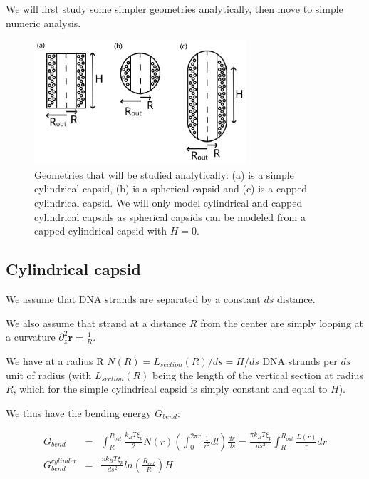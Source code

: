 \documentclass{article}
\begin{document}
We will first study some simpler geometries analytically, then move to simple numeric analysis.

\begin{figure}[H]
    \centering
    \includegraphics[width=0.7\textwidth]{analitical_geometries.png}
    \caption{Geometries that will be studied analytically: (a) is a simple cylindrical capsid, (b) is a spherical capsid and (c) is a capped cylindrical capsid. We will only model cylindrical and capped cylindrical capsids as spherical capsids can be modeled from a capped-cylindrical capsid with $H=0$.}
    \label{fig:enter-label}
\end{figure}

\subsection{Cylindrical capsid}

We assume that DNA strands are separated by a constant $ds$ distance.

We also assume that strand at a distance $R$ from the center are simply looping at a curvature $\partial_z^2 \mathbf{r} = \frac{1}{R}$.

We have at a radius R $N(R) = L_{section}(R)/ds = H/ds$ DNA strands per $ds$ unit of radius (with $L_{section}(R)$ being the length of the vertical section at radius $R$, which for the simple cylindrical capsid is simply constant and equal to $H$).

We thus have the bending energy $G_{bend}$:

\begin{eqnarray}
    G_{bend} & = & \int_{R}^{R_{out}} \frac{k_B T \xi_p}{2} N(r)  \left( \int_{0}^{2\pi r} \frac{1}{r^2} dl \right) \frac{dr}{ds} =  \frac{\pi k_B T \xi_p}{ds^2} \int_{R}^{R_{out}} \frac{L(r)}{r} dr \\
    G_{bend}^{cylinder} & = & \frac{\pi k_B T \xi_p}{ds^2} ln(\frac{R_{out}}{R}) H
\end{eqnarray}
\end{document}
